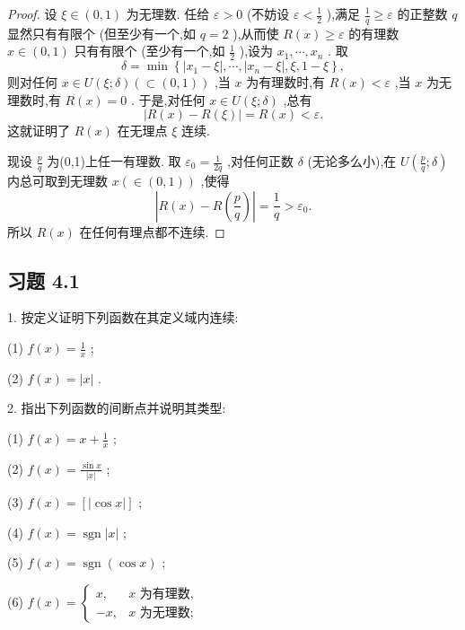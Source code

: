 \begin{proof}
设 \(\xi  \in  \left( {0,1}\right)\) 为无理数. 任给 \(\varepsilon  > 0\) (不妨设 \(\varepsilon  < \frac{1}{2}\) ),满足 \(\frac{1}{q} \geq  \varepsilon\) 的正整数 \(q\) 显然只有有限个 (但至少有一个,如 \(q = 2\) ),从而使 \(R\left( x\right)  \geq  \varepsilon\) 的有理数 \(x \in  \left( {0,1}\right)\) 只有有限个 (至少有一个,如 \(\frac{1}{2}\) ),设为 \({x}_{1},\cdots ,{x}_{n}\) . 取
\[
\delta  = \min \left\{  {\left| {{x}_{1} - \xi }\right| ,\cdots ,\left| {{x}_{n} - \xi }\right| ,\xi ,1 - \xi }\right\}  ,
\]
则对任何 \(x \in  U\left( {\xi ;\delta }\right) \left( { \subset  \left( {0,1}\right) }\right)\) ,当 \(x\) 为有理数时,有 \(R\left( x\right)  < \varepsilon\) ,当 \(x\) 为无理数时,有 \(R\left( x\right)  = 0\) . 于是,对任何 \(x \in  U\left( {\xi ;\delta }\right)\) ,总有
\[
\left| {R\left( x\right)  - R\left( \xi \right) }\right|  = R\left( x\right)  < \varepsilon .
\]
这就证明了 \(R\left( x\right)\) 在无理点 \(\xi\) 连续.

现设 \(\frac{p}{q}\) 为(0,1)上任一有理数. 取 \({\varepsilon }_{0} = \frac{1}{2q}\) ,对任何正数 \(\delta\) (无论多么小),在 \(U\left( {\frac{p}{q};\delta }\right)\) 内总可取到无理数 \(x\left( { \in  \left( {0,1}\right) }\right)\) ,使得
\[
\left| {R\left( x\right)  - R\left( \frac{p}{q}\right) }\right|  = \frac{1}{q} > {\varepsilon }_{0}.
\]
所以 \(R\left( x\right)\) 在任何有理点都不连续.
\end{proof}


\subsection{习题 4.1}

1. 按定义证明下列函数在其定义域内连续:

(1) \(f\left( x\right)  = \frac{1}{x}\) ;

(2) \(f\left( x\right)  = \left| x\right|\) .

2. 指出下列函数的间断点并说明其类型:

(1) \(f\left( x\right)  = x + \frac{1}{x}\) ;

(2) \(f\left( x\right)  = \frac{\sin x}{\left| x\right| }\) ;

(3) \(f\left( x\right)  = \left\lbrack  \left| {\cos x}\right| \right\rbrack\) ;

(4) \(f\left( x\right)  = \operatorname{sgn}\left| x\right|\) ;

(5) \(f\left( x\right)  = \operatorname{sgn}\left( {\cos x}\right)\) ;

(6) \(f\left( x\right)  = \left\{  \begin{matrix} x, & x\text{ 为有理数, } \\   - x, & x\text{ 为无理数; } \end{matrix}\right.\)

